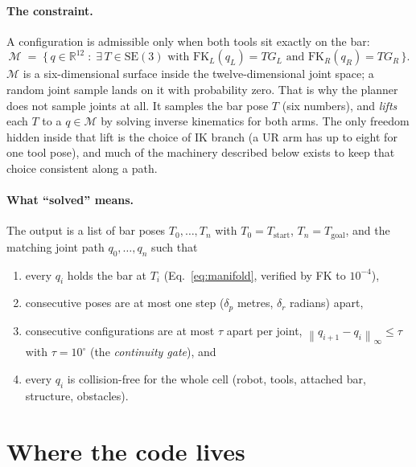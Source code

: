 \documentclass[11pt,a4paper]{article}
\newcommand{\R}{\mathbb{R}}
\newcommand{\SE}{\mathrm{SE}(3)}
\newcommand{\norm}[1]{\left\lVert #1 \right\rVert}
\begin{document}
\paragraph{The constraint.}
A configuration is admissible only when both tools sit exactly on the bar:
\begin{equation}
  \mathcal{M} \;=\; \bigl\{\, q \in \R^{12} \;:\;
    \exists\, T \in \SE \text{ with } \mathrm{FK}_L(q_L) = T G_L
    \text{ and } \mathrm{FK}_R(q_R) = T G_R \,\bigr\}.
  \label{eq:manifold}
\end{equation}
$\mathcal{M}$ is a six-dimensional surface inside the twelve-dimensional joint
space; a random joint sample lands on it with probability zero. That is why the
planner does not sample joints at all. It samples the bar pose $T$ (six
numbers), and \emph{lifts} each $T$ to a $q \in \mathcal{M}$ by solving
inverse kinematics for both arms. The only freedom hidden inside that lift is
the choice of IK branch (a UR arm has up to eight for one tool pose), and much
of the machinery described below exists to keep that choice consistent along a
path.

\paragraph{What ``solved'' means.}
The output is a list of bar poses $T_0,\dots,T_n$ with $T_0 = T_{\text{start}}$,
$T_n = T_{\text{goal}}$, and the matching joint path $q_0,\dots,q_n$ such that
\begin{enumerate}[nosep,label=(\roman*)]
  \item every $q_i$ holds the bar at $T_i$ (Eq.~\ref{eq:manifold}, verified by
        FK to $10^{-4}$),
  \item consecutive poses are at most one step
        ($\delta_p$ metres, $\delta_r$ radians) apart,
  \item consecutive configurations are at most $\tau$ apart per joint,
        $\norm{q_{i+1}-q_i}_\infty \le \tau$ with $\tau = 10^\circ$
        (the \emph{continuity gate}), and
  \item every $q_i$ is collision-free for the whole cell (robot, tools,
        attached bar, structure, obstacles).
\end{enumerate}

\section{Where the code lives}
\label{sec:where}
\end{document}
